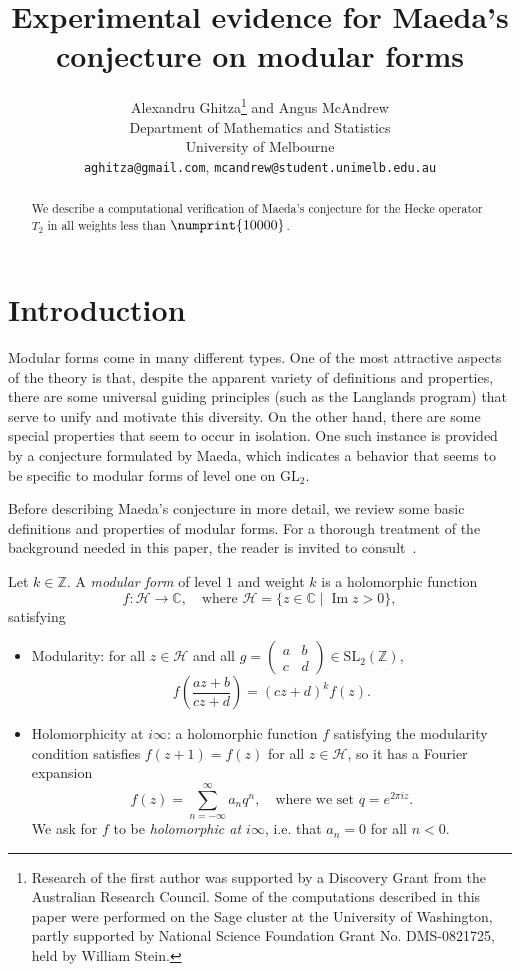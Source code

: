 \documentclass[11pt]{article}
\title{Experimental evidence for Maeda's conjecture on modular forms
}
\author{
Alexandru Ghitza\footnote{Research of the first author was supported by 
a Discovery Grant from the Australian Research Council.
Some of the computations described in this paper were performed on the Sage
cluster at the University of Washington, partly supported by National 
Science Foundation Grant No. DMS-0821725, held by William Stein.}  
{} and 
Angus McAndrew\\
Department of Mathematics and Statistics\\
University of Melbourne\\
{\tt aghitza@gmail.com}, {\tt mcandrew@student.unimelb.edu.au}
}
\date{}
\theoremstyle{plain}
\theoremstyle{definition}
\theoremstyle{remark}
\numberwithin{equation}{section}
\newcommand{\longto}{\longrightarrow}
\newcommand{\CC}{\mathbb{C}}
\newcommand{\ZZ}{\mathbb{Z}}
\newcommand{\cH}{\mathcal{H}}
\renewcommand{\Im}{\operatorname{Im}}
\newcommand{\bound}{\numprint{10000}}
\newcommand{\GL}{\mathrm{GL}}
\newcommand{\SL}{\mathrm{SL}}
\begin{document}
\thispagestyle{empty}

\maketitle
\begin{abstract}
  We describe a computational verification of Maeda's conjecture for the Hecke
  operator $T_2$ in all weights less than $\bound$.
\end{abstract}


\section{Introduction}
Modular forms come in many different types.  One of the most attractive
aspects of the theory is that, despite the apparent variety of definitions
and properties, there are some universal guiding principles (such as the
Langlands program) that serve to unify and motivate this diversity.  On the
other hand, there are some special properties that seem to occur in isolation.
One such instance is provided by a conjecture formulated by Maeda, which
indicates a behavior that seems to be specific to modular forms of level one
on $\GL_2$.  

Before describing Maeda's conjecture in more detail, we review some basic 
definitions and properties of modular forms.  For a thorough treatment of
the background needed in this paper, the reader is invited to
consult~\cite{Stein}.

Let $k\in\ZZ$.  A \emph{modular form} of level $1$ and weight $k$ is a
holomorphic function
\begin{equation*}
  f\colon\cH\longto\CC, \quad\text{where }
  \cH=\{z\in\CC\mid \Im z>0\},
\end{equation*}
satisfying
\begin{itemize}
  \item Modularity: for all $z\in\cH$ and all
    $g=\left(\begin{smallmatrix}a&b\\c&d\end{smallmatrix}\right)\in\SL_2(\ZZ)$,
      \begin{equation*}
        f\left(\frac{az+b}{cz+d}\right)=(cz+d)^kf(z).
      \end{equation*}
  \item Holomorphicity at $i\infty$: a holomorphic function $f$ satisfying the
    modularity condition satisfies $f(z+1)=f(z)$ for all $z\in\cH$, so it has
    a Fourier expansion
    \begin{equation*}
      f(z)=\sum_{n=-\infty}^\infty a_nq^n,\quad\text{where we set }
      q=e^{2\pi i z}.
    \end{equation*}
    We ask for $f$ to be \emph{holomorphic at $i\infty$}, i.e. that $a_n=0$
    for all $n<0$.
\end{itemize}
\end{document}

